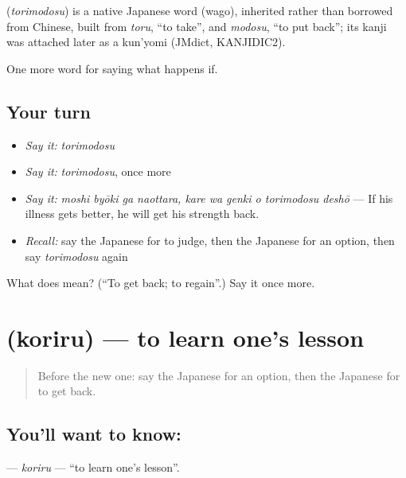 \begin{cousinweb}
\textbf{} (\emph{torimodosu}) is a native Japanese word (wago), inherited rather than borrowed from Chinese, built from \emph{toru}, \textquotedblleft{}to take\textquotedblright{}, and \emph{modosu}, \textquotedblleft{}to put back\textquotedblright{}; its kanji was attached later as a kun'yomi (JMdict, KANJIDIC2).
\end{cousinweb}

\begin{grammarlens}[title={What you've built}]
One more word for saying what happens if.
\end{grammarlens}

\subsection*{Your turn}
\begin{itemize}
\raggedright
  \item \emph{Say it:} \emph{torimodosu}
  \item \emph{Say it:} \emph{torimodosu}, once more
  \item \emph{Say it:} \emph{moshi byōki ga naottara, kare wa genki o torimodosu deshō} — If his illness gets better, he will get his strength back.
  \item \emph{Recall:} say the Japanese for to judge, then the Japanese for an option, then say \emph{torimodosu} again
\end{itemize}

\begin{tcolorbox}[breakable,colback=teal!4,colframe=teal!35!black,title={Before you move on}]
What does  mean? (\textquotedblleft{}To get back; to regain\textquotedblright{}.) Say it once more.
\end{tcolorbox}
\section[\texorpdfstring{\ja{こりる} (koriru)}{こりる (koriru)}]{ (koriru) — to learn one's lesson}

\label{lesson:JA-C518-koriru}



\begin{quote}
Before the new one: say the Japanese for an option, then the Japanese for to get back.
\end{quote}

\subsection*{You'll want to know: }
\textbf{} — \emph{koriru} — \textquotedblleft{}to learn one's lesson\textquotedblright{}.

